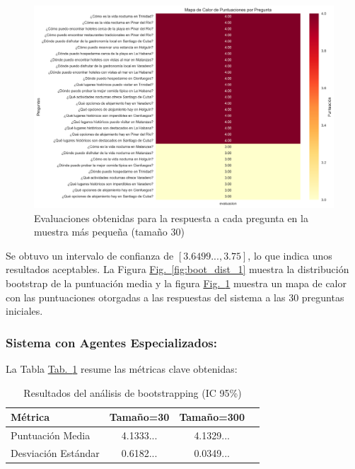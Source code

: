 \documentclass[10pt]{llncs}
\newcommand{\figref}[1]{\hyperref[#1]{Fig.~\ref*{#1}}}
\newcommand{\tabref}[1]{\hyperref[#1]{Tab.~\ref*{#1}}}
\begin{document}
\begin{figure}[h]
\centering
\includegraphics[width=1\textwidth]{../src/experiments/one_only_agent/quality_heatmap_20250614-143724.png}
\caption{Evaluaciones obtenidas para la respuesta a cada pregunta en la muestra más pequeña (tamaño 30)}
\label{fig:eval_1}
\end{figure}

\begin{remark}
Se obtuvo un intervalo de confianza de $[3.6499..., 3.75]$, lo que indica unos resultados aceptables. 
La Figura {\figref{fig:boot_dist_1}} muestra la distribución bootstrap de la puntuación media y la figura
{\figref{fig:eval_1}} muestra un mapa de calor con las puntuaciones otorgadas a las respuestas del sistema a las 
30 preguntas iniciales.
\end{remark}

\subsubsection{Sistema con Agentes Especializados:}

La Tabla \tabref{tab:boot_results_2} resume las métricas clave obtenidas:

\begin{table}[h]
\centering
\caption{Resultados del análisis de bootstrapping (IC 95\%)}
\label{tab:boot_results_2}
\begin{tabular}{lccc}
\hline
\textbf{Métrica} & \textbf{Tamaño=30} & \textbf{Tamaño=300}  \\
\hline 
Puntuación Media& 4.1333... & 4.1329...  \\
Desviación Estándar & 0.6182... & 0.0349...  \\
\hline
\end{tabular}
\end{table}
\end{document}
